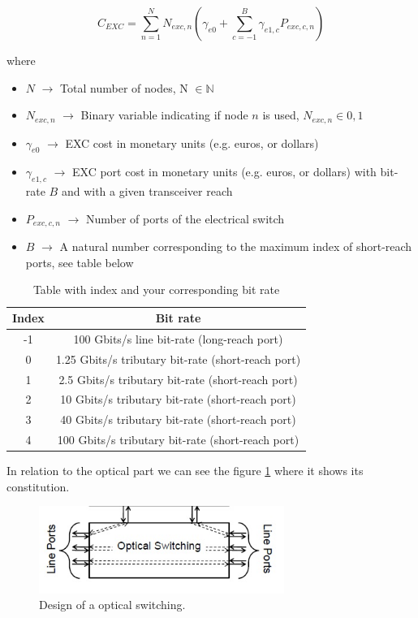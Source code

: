 \begin{equation}
C_{EXC} = \sum_{n=1}^{N} N_{exc,n} \left( \gamma_{e0} + \sum_{c=-1}^B \gamma_{e1,c} P_{exc,c,n} \right)
\label{Capex_Node_EXC}
\end{equation}

\noindent
where
\begin{itemize}
\item{$N$				$\rightarrow$	Total number of nodes, N $\in \mathbb{N}$}
\item{$N_{exc,n}$		$\rightarrow$	Binary variable indicating if node $n$ is used, $N_{exc,n} \in {0, 1}$}
\item{$\gamma_{e0}$ 	$\rightarrow$	EXC cost in monetary units (e.g. euros, or dollars)}
\item{$\gamma_{e1,c}$	$\rightarrow$	EXC port cost in monetary units (e.g. euros, or dollars) with bit-rate $B$ and with a given transceiver reach}
\item{$P_{exc,c,n}$	    $\rightarrow$	Number of ports of the electrical switch}
\item{$B$           	$\rightarrow$	A natural number corresponding to the maximum index of short-reach ports, see table below}
\end{itemize}

\begin{table}[h!]
\centering
\begin{tabular}{|c|c|}
  \hline
  Index & Bit rate \\
 \hline\hline
  -1 & 100 Gbits/s line bit-rate (long-reach port) \\
  0 & 1.25 Gbits/s tributary bit-rate (short-reach port) \\
  1 & 2.5 Gbits/s tributary bit-rate (short-reach port) \\
  2 & 10 Gbits/s tributary bit-rate (short-reach port) \\
  3 & 40 Gbits/s tributary bit-rate (short-reach port) \\
  4 & 100 Gbits/s tributary bit-rate (short-reach port) \\
  \hline
\end{tabular}
\caption{Table with index and your corresponding bit rate}
\label{table_bitrate}
\end{table}

\newpage
In relation to the optical part we can see the figure \ref{oxc_design} where it shows its constitution.\\

\begin{figure}[h!]
\centering
\includegraphics[width=8cm]{sdf/ILP/figures/oxc_design}
\caption{Design of a optical switching.}
\label{oxc_design}
\end{figure}


